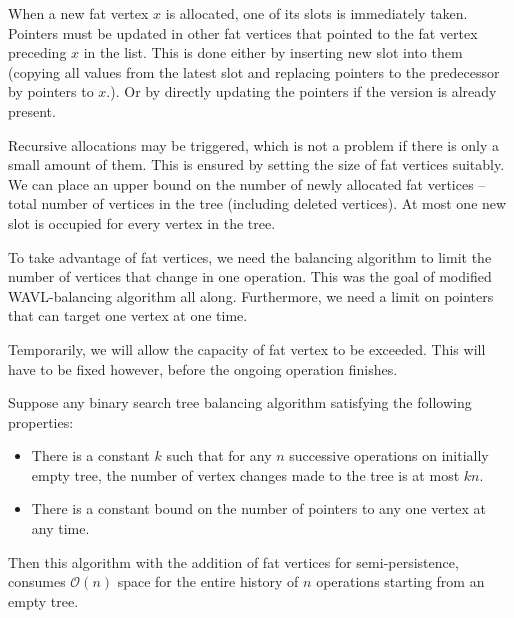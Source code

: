 When a new fat vertex $x$ is allocated, one of its slots is immediately taken. Pointers must be updated in other fat vertices that pointed to the fat vertex preceding $x$ in the list. This is done either by inserting new slot into them (copying all values from the latest slot and replacing pointers to the predecessor by pointers to $x$.). Or by directly updating the pointers if the version is already present. 

Recursive allocations may be triggered, which is not a problem if there is only a small amount of them. This is ensured by setting the size of fat vertices suitably. We can place an upper bound on the number of newly allocated fat vertices -- total number of vertices in the tree (including deleted vertices). At most one new slot is occupied for every vertex in the tree.

To take advantage of fat vertices, we need the balancing algorithm to limit the number of vertices that change in one operation. This was the goal of modified WAVL-balancing algorithm all along. Furthermore, we need a limit on pointers that can target one vertex at one time.

Temporarily, we will allow the capacity of fat vertex to be exceeded. This will have to be fixed however, before the ongoing operation finishes.

\begin{prop}
Suppose any binary search tree balancing algorithm satisfying the following properties:
\begin{itemize}
\item 
There is a constant $k$ such that for any $n$ successive operations on initially empty tree, the number of vertex changes made to the tree is at most $kn$. 
\item 
There is a constant bound on the number of pointers to any one vertex at any time.
\end{itemize}
Then this algorithm with the addition of fat vertices for semi-persistence, consumes $\mathcal{O}(n)$ space for the entire history of $n$ operations starting from an empty tree.
\end{prop}

